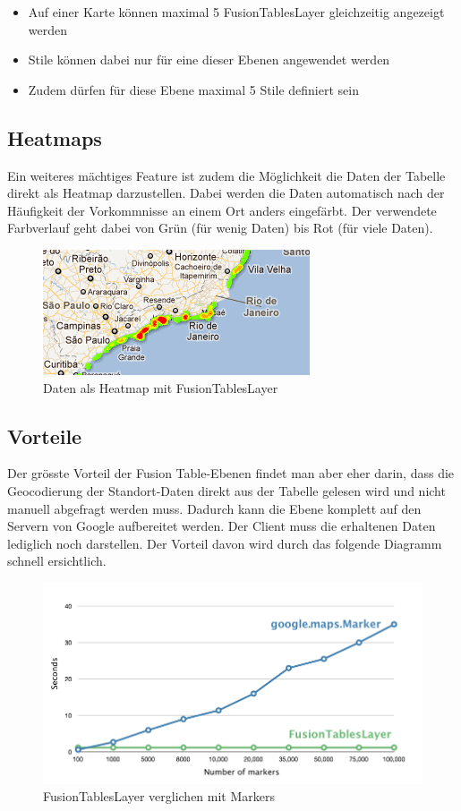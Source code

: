 \begin{itemize}
\item Auf einer Karte können maximal 5 FusionTablesLayer gleichzeitig angezeigt werden
\item Stile können dabei nur für eine dieser Ebenen angewendet werden
\item Zudem dürfen für diese Ebene maximal 5 Stile definiert sein
\end{itemize}

\subsection{Heatmaps}
Ein weiteres mächtiges Feature ist zudem die Möglichkeit die Daten der Tabelle direkt als Heatmap darzustellen. Dabei werden die Daten automatisch nach der Häufigkeit der Vorkommnisse an einem Ort anders eingefärbt. Der verwendete Farbverlauf geht dabei von Grün (für wenig Daten) bis Rot (für viele Daten). 

\begin{figure}[htbp]
	\centering
	\includegraphics{images/gmap_fusiontableslayer_heatmap.png}
	\caption{Daten als Heatmap mit FusionTablesLayer}
	\label{fusiontableslayer-heatmap}
\end{figure}

\subsection{Vorteile}
Der grösste Vorteil der Fusion Table-Ebenen findet man aber eher darin, dass die Geocodierung der Standort-Daten direkt aus der Tabelle gelesen wird und nicht manuell abgefragt werden muss. Dadurch kann die Ebene komplett auf den Servern von Google aufbereitet werden. Der Client muss die erhaltenen Daten lediglich noch darstellen. Der Vorteil davon wird durch das folgende Diagramm schnell ersichtlich.

\begin{figure}[htbp]
	\centering
	\includegraphics[scale=0.5]{images/gmap_fusiontableslayer_vs_markers.png}
	\caption{FusionTablesLayer verglichen mit Markers}
	\label{fusiontableslayer-compare_markers}
\end{figure}

